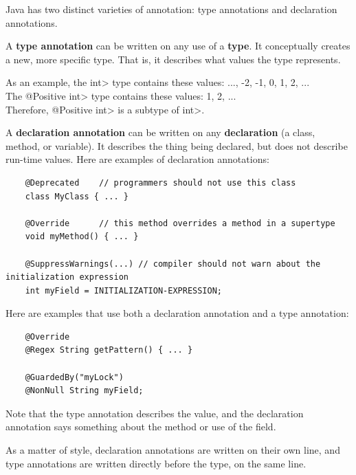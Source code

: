 
Java has two distinct varieties of annotation:  type annotations and
declaration annotations.

A \textbf{type annotation} can be written on any use of a \textbf{type}.
It conceptually creates a new, more specific type.
That is, it describes what values the type represents.

As an example, the \<int> type contains these values: ..., -2, -1, 0, 1, 2, ...  \\
The \<@Positive int> type contains these values:  1, 2, ...   \\
Therefore, \<@Positive int> is a subtype of \<int>.

A \textbf{declaration annotation} can be written on any \textbf{declaration} (a class, method, or variable).  It describes the thing being declared, but does not describe run-time values.  Here are examples of declaration annotations:

\begin{Verbatim}
    @Deprecated    // programmers should not use this class
    class MyClass { ... }

    @Override      // this method overrides a method in a supertype
    void myMethod() { ... }

    @SuppressWarnings(...) // compiler should not warn about the initialization expression
    int myField = INITIALIZATION-EXPRESSION;
\end{Verbatim}

Here are examples that use both a declaration annotation and a type annotation:

\begin{Verbatim}
    @Override
    @Regex String getPattern() { ... }

    @GuardedBy("myLock")
    @NonNull String myField;
\end{Verbatim}

Note that the type annotation describes the value, and the declaration annotation says something about the method or use of the field.

As a matter of style, declaration annotations are written on their own line, and type annotations are written directly before the type, on the same line.




